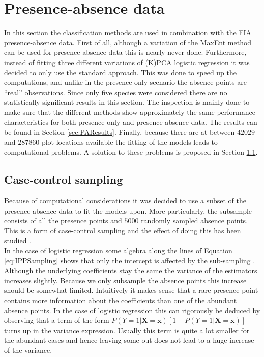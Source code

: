 \section{Presence-absence data}
\label{sec:PAData}
In this section the classification methods are used in combination with the FIA presence-absence data. First of all, although a variation of the MaxEnt method can be used for presence-absence data this is nearly never done. Furthermore, instead of fitting three different variations of (K)PCA logistic regression it was decided to only use the standard approach. This was done to speed up the computations, and unlike in the presence-only scenario the absence points are ``real'' observations. Since only five species were considered there are no statistically significant results in this section. The inspection is mainly done to make sure that the different methods show approximately the same performance characteristics for both presence-only and presence-absence data. The results can be found in Section \ref{sec:PAResults}. Finally, because there are at between $42029$ and $287860$ plot locations available the fitting of the models leads to computational problems. A solution to these problems is proposed in Section \ref{sec:CaseControlSubsampling}.
\subsection{Case-control sampling}
\label{sec:CaseControlSubsampling}
Because of computational considerations it was decided to use a subset of the presence-absence data to fit the models upon. More particularly, the subsample consists of all the presence points and $5000$ randomly sampled absence points. This is a form of case-control sampling and the effect of doing this has been studied \parencite{king_logistic_2001}. \\

In the case of logistic regression some algebra along the lines of Equation \ref{eq:IPPSampling} shows that only the intercept is affected by the sub-sampling \parencite{king_logistic_2001}. Although the underlying coefficients stay the same the variance of the estimators increases slightly. Because we only subsample the absence points this increase should be somewhat limited. Intuitively it makes sense that a rare presence point contains more information about the coefficients than one of the abundant absence points. In the case of logistic regression this can rigorously be deduced by observing that a term of the form $P(Y=1|\bm{X} = \bm{x}) \left[1- P(Y=1|\bm{X} = \bm{x}) \right]$ turns up in the variance expression. Usually this term is quite a lot smaller for the abundant cases and hence leaving some out does not lead to a huge increase of the variance. \\ 

